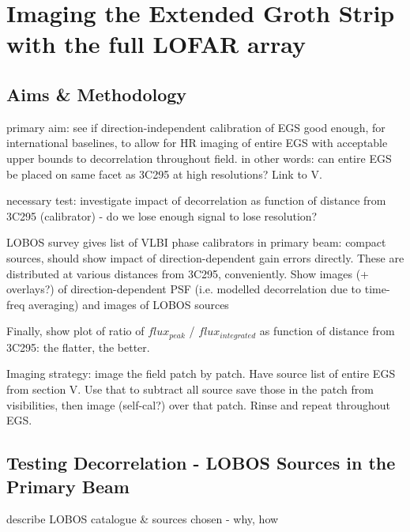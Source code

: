 \chapter{Imaging the Extended Groth Strip with the full LOFAR array}\label{section.EGS.hires}
\minitoc
\section{Aims \& Methodology}

\pg
primary aim: see if direction-independent calibration of EGS good enough, for international baselines, to allow for HR imaging of entire EGS with acceptable upper bounds to decorrelation throughout field.
\pg
in other words: can entire EGS be placed on same facet as 3C295 at high resolutions? Link to V.

\pg
necessary test: investigate impact of decorrelation as function of distance from 3C295 (calibrator) - do we lose enough signal to lose resolution?

\pg LOBOS survey gives list of VLBI phase calibrators in primary beam: compact sources, should show impact of direction-dependent gain errors directly. These are distributed at various distances from 3C295, conveniently.
\pg
Show images (+ overlays?) of direction-dependent PSF (i.e. modelled decorrelation due to time-freq averaging) and images of LOBOS sources

\pg
Finally, show plot of ratio of $flux_{peak}$ / $flux_{integrated}$ as function of distance from 3C295: the flatter, the better.

\pg
Imaging strategy: image the field patch by patch.
\pg
Have source list of entire EGS from section V. Use that to subtract all source save those in the patch from visibilities, then image (self-cal?) over that patch. Rinse and repeat throughout EGS.


\section{Testing Decorrelation - LOBOS Sources in the Primary Beam}

\pg
describe LOBOS catalogue \& sources chosen  - why, how

